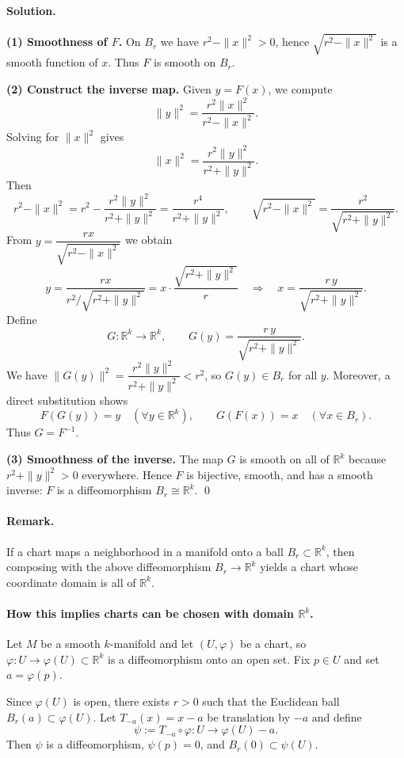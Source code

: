 \documentclass[12pt,a4paper]{article}
\theoremstyle{plain}
\theoremstyle{definition}      %
\begin{document}
\paragraph{Solution.}
\textbf{(1) Smoothness of $F$.}
On $B_r$ we have $r^2-\|x\|^2>0$, hence $\sqrt{r^2-\|x\|^2}$ is a smooth function of $x$.
Thus $F$ is smooth on $B_r$.

\medskip
\textbf{(2) Construct the inverse map.}
Given $y=F(x)$, we compute
\[
\|y\|^2=\frac{r^2\|x\|^2}{r^2-\|x\|^2}.
\]
Solving for $\|x\|^2$ gives
\[
\|x\|^2=\frac{r^2\|y\|^2}{r^2+\|y\|^2}.
\]
Then
\[
r^2-\|x\|^2
=r^2-\frac{r^2\|y\|^2}{r^2+\|y\|^2}
=\frac{r^4}{r^2+\|y\|^2},
\qquad
\sqrt{r^2-\|x\|^2}=\frac{r^2}{\sqrt{r^2+\|y\|^2}}.
\]
From $y=\dfrac{r x}{\sqrt{r^2-\|x\|^2}}$ we obtain
\[
y= \frac{r x}{r^2/\sqrt{r^2+\|y\|^2}}
= x\cdot\frac{\sqrt{r^2+\|y\|^2}}{r}
\quad\Longrightarrow\quad
x=\frac{r\,y}{\sqrt{r^2+\|y\|^2}}.
\]
Define
\[
G:\mathbb{R}^k\to \mathbb{R}^k,\qquad
G(y)=\frac{r\,y}{\sqrt{r^2+\|y\|^2}}.
\]
We have $\|G(y)\|^2=\dfrac{r^2\|y\|^2}{r^2+\|y\|^2}<r^2$, so $G(y)\in B_r$ for all $y$.
Moreover, a direct substitution shows
\[
F(G(y))=y\quad(\forall y\in\mathbb{R}^k),
\qquad
G(F(x))=x\quad(\forall x\in B_r).
\]
Thus $G=F^{-1}$.

\medskip
\textbf{(3) Smoothness of the inverse.}
The map $G$ is smooth on all of $\mathbb{R}^k$ because $r^2+\|y\|^2>0$ everywhere.
Hence $F$ is bijective, smooth, and has a smooth inverse: $F$ is a diffeomorphism
$B_r\cong\mathbb{R}^k$.
\qed

\paragraph{Remark.}
If a chart maps a neighborhood in a manifold onto a ball $B_r\subset\mathbb{R}^k$,
then composing with the above diffeomorphism $B_r\to\mathbb{R}^k$ yields a chart
whose coordinate domain is all of $\mathbb{R}^k$.


\paragraph{How this implies charts can be chosen with domain $\mathbb{R}^k$.}
Let $M$ be a smooth $k$-manifold and let $(U,\varphi)$ be a chart, so
$\varphi:U\to \varphi(U)\subset\mathbb{R}^k$ is a diffeomorphism onto an open set.
Fix $p\in U$ and set $a=\varphi(p)$.

Since $\varphi(U)$ is open, there exists $r>0$ such that the Euclidean ball
$B_r(a)\subset \varphi(U)$. Let $T_{-a}(x)=x-a$ be translation by $-a$ and define
\[
\psi := T_{-a}\circ \varphi : U\longrightarrow \varphi(U)-a .
\]
Then $\psi$ is a diffeomorphism, $\psi(p)=0$, and $B_r(0)\subset \psi(U)$.
\end{document}
